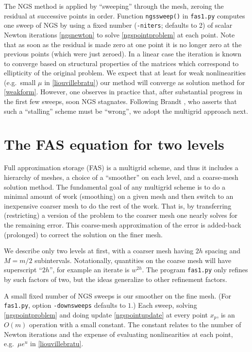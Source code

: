 \documentclass[letterpaper,final,12pt,reqno]{amsart}
\begin{document}
The NGS method is applied by ``sweeping'' through the mesh, zeroing the residual at successive points in order.  Function \texttt{ngssweep()} in \texttt{fas1.py} computes one sweep of NGS by using a fixed number (\texttt{-niters}; defaults to 2) of scalar Newton iterations \eqref{ngsnewton} to solve \eqref{ngspointproblem} at each point.  Note that as soon as the residual is made zero at one point it is no longer zero at the previous points (which were just zeroed).  In a linear case the iteration is known to converge based on structural properties of the matrices \cite[for example]{Greenbaum1997} which correspond to ellipticity of the original problem.  We expect that at least for weak nonlinearities (e.g.~small $\mu$ in \eqref{liouvillebratu}) our method will converge as solution method for \eqref{weakform}.  However, one observes in practice that, after substantial progress in the first few sweeps, soon NGS stagnates.  Following Brandt \cite{Brandt1977}, who asserts that such a ``stalling'' scheme must be ``wrong'', we adopt the multigrid approach next.


\section{The FAS equation for two levels}

Full approximation storage (FAS) \cite{Brandt1977,Briggsetal2000} is a multigrid scheme, and thus it includes a hierarchy of meshes, a choice of a ``smoother'' on each level, and a coarse-mesh solution method.  The fundamental goal of any multigrid scheme is to do a minimal amount of work (smoothing) on a given mesh and then switch to an inexpensive coarser mesh to do the rest of the work.  That is, by transferring (restricting) a version of the problem to the coarser mesh one nearly solves for the remaining error.  This coarse-mesh approximation of the error is added-back (prolonged) to correct the solution on the finer mesh.

We describe only two levels at first, with a coarser mesh having $2h$ spacing and $M=m/2$ subintervals.  Notationally, quantities on the coarse mesh will have superscript ``$2h$'', for example an iterate is $w^{2h}$.  The program \texttt{fas1.py} only refines by such factors of two, but the ideas generalize to other refinement factors.

A small fixed number of NGS sweeps is our smoother on the fine mesh.  (For \texttt{fas1.py}, option \texttt{-downsweeps} defaults to $1$.)  Each sweep, solving \eqref{ngspointproblem} and doing update \eqref{ngspointupdate} at every point $x_p$, is an $O(m)$ operation with a small constant.  The constant relates to the number of Newton iterations and the expense of evaluating nonlinearities at each point, e.g.~$\mu e^u$ in \eqref{liouvillebratu}.
\end{document}

